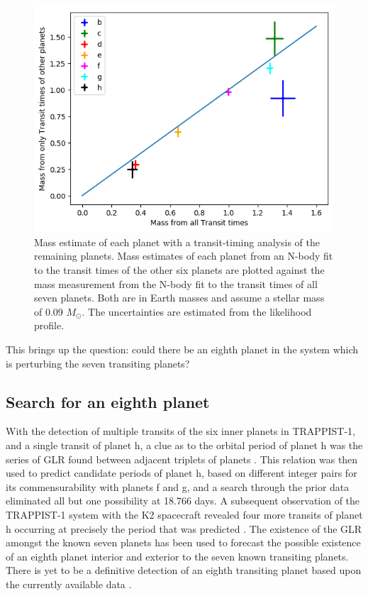 \documentclass[fleqn,usenatbib]{mnras} %
\begin{document}
\begin{figure}
    \centering
    \includegraphics[width=\hsize]{figures/Mass_detect_vs_mass_all.png}
    \caption{Mass estimate of each planet with a transit-timing analysis of the remaining planets.  Mass estimates of each planet from an N-body fit to the transit times of the other six planets are plotted against the mass measurement from the N-body fit to the transit times of all seven planets.  Both are in Earth masses and assume a stellar mass of 0.09 $M_\odot$.  The uncertainties are estimated from the likelihood profile.
    }
    \label{fig:planet_detection}
\end{figure}

This brings up the question:  could there be an eighth planet in the
system which is perturbing the seven transiting planets?

\subsection{Search for an eighth planet}

With the detection of multiple transits of the six inner planets in TRAPPIST-1, and
a single transit of planet h, a clue as to the orbital period of planet h was the
series of GLR found between adjacent triplets of planets
\citep{Papaloizou2014}.  This
relation was then used to predict candidate periods of planet h, based on different
integer pairs for its commensurability with planets f and g, and a search through
the prior data eliminated all but one possibility at 18.766 days.  A subsequent
observation of the TRAPPIST-1 system with the K2 spacecraft revealed four more
transits of planet h occurring at precisely the period that was predicted 
\citep{Luger2017a}.  The existence of the GLR amongst the known seven planets has been used to forecast
the possible existence of an eighth planet interior \citep{Pletser2017} and exterior
\citep{Kipping2018} to the seven known transiting planets.  There is yet to be a definitive detection of an eighth transiting planet based upon the currently available data \citep{Ducrot2020}.
\end{document}
